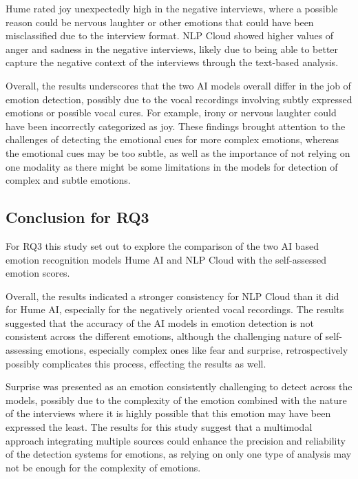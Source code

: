 Hume rated joy unexpectedly high in the negative interviews, where a possible reason could be nervous laughter or other emotions that could have been misclassified due to the interview format. NLP Cloud showed higher values of anger and sadness in the negative interviews, likely due to being able to better capture the negative context of the interviews through the text-based analysis.

Overall, the results underscores that the two AI models overall differ in the job of emotion detection, possibly due to the vocal recordings involving subtly expressed emotions or possible vocal cures. For example, irony or nervous laughter could have been incorrectly categorized as joy. These findings brought attention to the challenges of detecting the emotional cues for more complex emotions, whereas the emotional cues may be too subtle, as well as the importance of not relying on one modality as there might be some limitations in the models for detection of complex and subtle emotions.

\subsection{Conclusion for RQ3}
For RQ3 this study set out to explore the comparison of the two AI based emotion recognition models Hume AI and NLP Cloud with the self-assessed emotion scores. 

Overall, the results indicated a stronger consistency for NLP Cloud than it did for Hume AI, especially for the negatively oriented vocal recordings. The results suggested that the accuracy of the AI models in emotion detection is not consistent across the different emotions, although the challenging nature of self-assessing emotions, especially complex ones like fear and surprise, retrospectively possibly complicates this process, effecting the results as well.

Surprise was presented as an emotion consistently challenging to detect across the models, possibly due to the complexity of the emotion combined with the nature of the interviews where it is highly possible that this emotion may have been expressed the least.
The results for this study suggest that a multimodal approach integrating multiple sources could enhance the precision and reliability of the detection systems for emotions, as relying on only one type of analysis may not be enough for the complexity of emotions.
